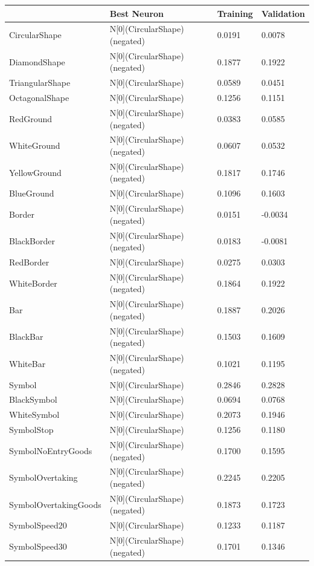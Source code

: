 \begin{tabular}{llll}
\toprule
 & Best Neuron & Training & Validation \\
\midrule
CircularShape & N[0](CircularShape) (negated) & 0.0191 & 0.0078 \\
DiamondShape & N[0](CircularShape) (negated) & 0.1877 & 0.1922 \\
TriangularShape & N[0](CircularShape) & 0.0589 & 0.0451 \\
OctagonalShape & N[0](CircularShape) & 0.1256 & 0.1151 \\
RedGround & N[0](CircularShape) (negated) & 0.0383 & 0.0585 \\
WhiteGround & N[0](CircularShape) (negated) & 0.0607 & 0.0532 \\
YellowGround & N[0](CircularShape) (negated) & 0.1817 & 0.1746 \\
BlueGround & N[0](CircularShape) & 0.1096 & 0.1603 \\
Border & N[0](CircularShape) (negated) & 0.0151 & -0.0034 \\
BlackBorder & N[0](CircularShape) (negated) & 0.0183 & -0.0081 \\
RedBorder & N[0](CircularShape) & 0.0275 & 0.0303 \\
WhiteBorder & N[0](CircularShape) (negated) & 0.1864 & 0.1922 \\
Bar & N[0](CircularShape) (negated) & 0.1887 & 0.2026 \\
BlackBar & N[0](CircularShape) (negated) & 0.1503 & 0.1609 \\
WhiteBar & N[0](CircularShape) (negated) & 0.1021 & 0.1195 \\
Symbol & N[0](CircularShape) & 0.2846 & 0.2828 \\
BlackSymbol & N[0](CircularShape) & 0.0694 & 0.0768 \\
WhiteSymbol & N[0](CircularShape) & 0.2073 & 0.1946 \\
SymbolStop & N[0](CircularShape) & 0.1256 & 0.1180 \\
SymbolNoEntryGoods & N[0](CircularShape) (negated) & 0.1700 & 0.1595 \\
SymbolOvertaking & N[0](CircularShape) (negated) & 0.2245 & 0.2205 \\
SymbolOvertakingGoods & N[0](CircularShape) (negated) & 0.1873 & 0.1723 \\
SymbolSpeed20 & N[0](CircularShape) & 0.1233 & 0.1187 \\
SymbolSpeed30 & N[0](CircularShape) (negated) & 0.1701 & 0.1346 \\

\end{tabular}
